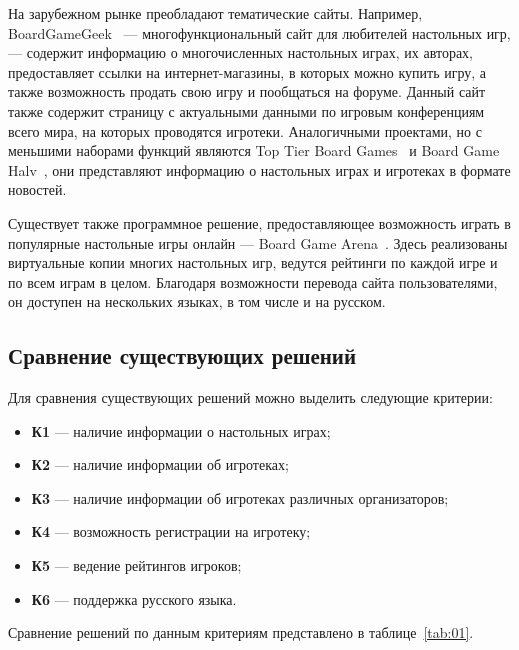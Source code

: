 На зарубежном рынке преобладают тематические сайты. Например,
BoardGameGeek~\cite{site04} --- многофункциональный сайт для любителей
настольных игр, --- содержит информацию о многочисленных настольных играх, их
авторах, предоставляет ссылки на интернет-магазины, в которых можно купить игру,
а также возможность продать свою игру и пообщаться на форуме. Данный сайт также
содержит страницу с актуальными данными по игровым конференциям всего мира, на
которых проводятся игротеки. Аналогичными проектами, но с меньшими наборами
функций являются Top Tier Board Games~\cite{site05} и Board Game
Halv~\cite{site06}, они представляют информацию о настольных играх и игротеках в
формате новостей.

Существует также программное решение, предоставляющее возможность играть в
популярные настольные игры онлайн --- Board Game Arena~\cite{site07}. Здесь
реализованы виртуальные копии многих настольных игр, ведутся рейтинги по каждой
игре и по всем играм в целом. Благодаря возможности перевода сайта
пользователями, он доступен на нескольких языках, в том числе и на русском.

\subsection{Сравнение существующих решений}

Для сравнения существующих решений можно выделить следующие критерии:
\begin{itemize}
    \item \textbf{К1} --- наличие информации о настольных играх;
    \item \textbf{К2} --- наличие информации об игротеках;
    \item \textbf{К3} --- наличие информации об игротеках различных
        организаторов;
    \item \textbf{К4} --- возможность регистрации на игротеку;
    \item \textbf{К5} --- ведение рейтингов игроков;
    \item \textbf{К6} --- поддержка русского языка.
\end{itemize}

Сравнение решений по данным критериям представлено в таблице~\ref{tab:01}.

